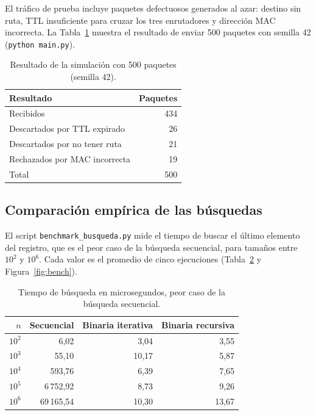 \documentclass[11pt,a4paper]{article}
\begin{document}
El tráfico de prueba incluye paquetes defectuosos generados al azar: destino
sin ruta, TTL insuficiente para cruzar los tres enrutadores y dirección MAC
incorrecta. La Tabla~\ref{tab:sim} muestra el resultado de enviar 500
paquetes con semilla 42 (\texttt{python main.py}).

\begin{table}[h]
\centering
\caption{Resultado de la simulación con 500 paquetes (semilla 42).}
\label{tab:sim}
\begin{tabular}{lr}
\toprule
Resultado & Paquetes \\
\midrule
Recibidos & 434 \\
Descartados por TTL expirado & 26 \\
Descartados por no tener ruta & 21 \\
Rechazados por MAC incorrecta & 19 \\
\midrule
Total & 500 \\
\bottomrule
\end{tabular}
\end{table}

\subsection{Comparación empírica de las búsquedas}

El script \texttt{benchmark\_busqueda.py} mide el tiempo de buscar el último
elemento del registro, que es el peor caso de la búsqueda secuencial, para
tamaños entre $10^2$ y $10^6$. Cada valor es el promedio de cinco ejecuciones
(Tabla~\ref{tab:bench} y Figura~\ref{fig:bench}).

\begin{table}[h]
\centering
\caption{Tiempo de búsqueda en microsegundos, peor caso de la búsqueda secuencial.}
\label{tab:bench}
\begin{tabular}{rrrr}
\toprule
$n$ & Secuencial & Binaria iterativa & Binaria recursiva \\
\midrule
$10^2$ & 6{,}02 & 3{,}04 & 3{,}55 \\
$10^3$ & 55{,}10 & 10{,}17 & 5{,}87 \\
$10^4$ & 593{,}76 & 6{,}39 & 7{,}65 \\
$10^5$ & 6\,752{,}92 & 8{,}73 & 9{,}26 \\
$10^6$ & 69\,165{,}54 & 10{,}30 & 13{,}67 \\
\bottomrule
\end{tabular}
\end{table}
\end{document}
